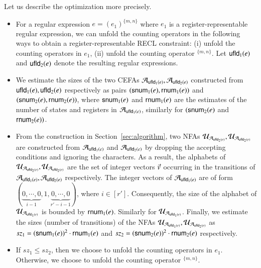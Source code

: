 Let us describe the optimization more precisely. 
\begin{itemize}
\item For a regular expression $e = (e_1)^{\{m,n\}}$ where $e_1$ is a register-representable regular expression, we can unfold the counting operators in the following ways to obtain a register-representable RECL constraint: (i) unfold the counting operators in $e_1$, (ii) unfold the counting operator $^{\{m,n\}}$. 
%
Let ${\sf ufld}_1(e)$ and ${\sf ufld}_2(e)$ denote the resulting regular expressions. 

\item We estimate the sizes of the two CEFAs $\mathcal{A}_{{\sf ufld}_1(e)}, \mathcal{A}_{{\sf ufld}_2(e)}$ constructed from ${\sf ufld}_1(e), {\sf ufld}_2(e)$ respectively as pairs $({\sf snum}_1(e), {\sf rnum}_1(e))$ and $({\sf snum}_2(e), {\sf rnum}_2(e))$, where ${\sf snum}_1(e)$ and ${\sf rnum}_1(e)$ are the estimates of the number of states and registers in $\mathcal{A}_{{\sf ufld}_1(e)}$, similarly for $({\sf snum}_2(e)$ and ${\sf rnum}_2(e))$. 
%
\item From the construction in Section~\ref{sec:algorithm}, 
two NFAs $\mathcal{U}_{\mathcal{A}_{{\sf ufld}_2(e)}}, \mathcal{U}_{\mathcal{A}_{{\sf ufld}_2(e)}}$ are constructed from $\mathcal{A}_{{\sf ufld}_1(e)}$ and $\mathcal{A}_{{\sf ufld}_2(e)}$ by dropping the accepting conditions and ignoring the characters. As a result, the alphabets of $\mathcal{U}_{\mathcal{A}_{{\sf ufld}_2(e)}}, \mathcal{U}_{\mathcal{A}_{{\sf ufld}_2(e)}}$ are the set of integer vectors  $\vec{v}$ occurring in the transitions of $\mathcal{A}_{{\sf ufld}_1(e)}, \mathcal{A}_{{\sf ufld}_2(e)}$ respectively. The integer vectors of  $\mathcal{A}_{{\sf ufld}_1(e)}$ are of form $(\underbrace{0, \cdots, 0}_{i-1}, 1, \underbrace{0, \cdots, 0}_{r'-i-1})$, where $i \in [r']$. Consequently, the size of the alphabet of $\mathcal{U}_{\mathcal{A}_{{\sf ufld}_1(e)}}$ is bounded by ${\sf rnum}_1(e)$. Similarly for $\mathcal{U}_{\mathcal{A}_{{\sf ufld}_1(e)}}$. 
Finally, we estimate the sizes (number of transitions) of the NFAs $\mathcal{U}_{\mathcal{A}_{{\sf ufld}_1(e)}}, \mathcal{U}_{\mathcal{A}_{{\sf ufld}_2(e)}}$ as $sz_1 = ({\sf snum}_1(e))^2 \cdot {\sf rnum}_1(e)$ and $sz_2 = ({\sf snum}_2(e))^2 \cdot {\sf rnum}_2(e)$ respectively.
%
\item If $sz_1 \le sz_2$, then we choose to unfold the counting operators in $e_1$. Otherwise, we choose to unfold the counting operator $^{\{m,n\}}$. 
\end{itemize}


